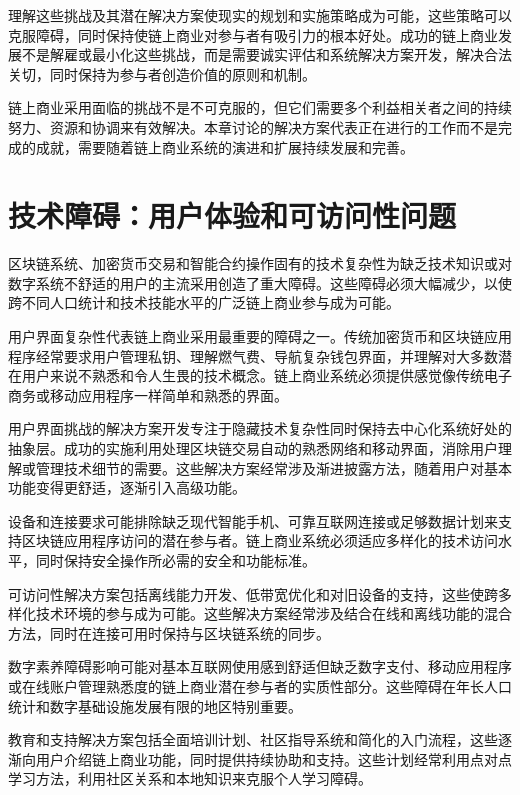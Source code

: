 \documentclass[
  Letterpaper,
]{scrbook}
\begin{document}
理解这些挑战及其潜在解决方案使现实的规划和实施策略成为可能，这些策略可以克服障碍，同时保持使链上商业对参与者有吸引力的根本好处。成功的链上商业发展不是解雇或最小化这些挑战，而是需要诚实评估和系统解决方案开发，解决合法关切，同时保持为参与者创造价值的原则和机制。

链上商业采用面临的挑战不是不可克服的，但它们需要多个利益相关者之间的持续努力、资源和协调来有效解决。本章讨论的解决方案代表正在进行的工作而不是完成的成就，需要随着链上商业系统的演进和扩展持续发展和完善。

\section{技术障碍：用户体验和可访问性问题}\label{ux6280ux672fux969cux788dux7528ux6237ux4f53ux9a8cux548cux53efux8bbfux95eeux6027ux95eeux9898}

区块链系统、加密货币交易和智能合约操作固有的技术复杂性为缺乏技术知识或对数字系统不舒适的用户的主流采用创造了重大障碍。这些障碍必须大幅减少，以使跨不同人口统计和技术技能水平的广泛链上商业参与成为可能。

用户界面复杂性代表链上商业采用最重要的障碍之一。传统加密货币和区块链应用程序经常要求用户管理私钥、理解燃气费、导航复杂钱包界面，并理解对大多数潜在用户来说不熟悉和令人生畏的技术概念。链上商业系统必须提供感觉像传统电子商务或移动应用程序一样简单和熟悉的界面。

用户界面挑战的解决方案开发专注于隐藏技术复杂性同时保持去中心化系统好处的抽象层。成功的实施利用处理区块链交易自动的熟悉网络和移动界面，消除用户理解或管理技术细节的需要。这些解决方案经常涉及渐进披露方法，随着用户对基本功能变得更舒适，逐渐引入高级功能。

设备和连接要求可能排除缺乏现代智能手机、可靠互联网连接或足够数据计划来支持区块链应用程序访问的潜在参与者。链上商业系统必须适应多样化的技术访问水平，同时保持安全操作所必需的安全和功能标准。

可访问性解决方案包括离线能力开发、低带宽优化和对旧设备的支持，这些使跨多样化技术环境的参与成为可能。这些解决方案经常涉及结合在线和离线功能的混合方法，同时在连接可用时保持与区块链系统的同步。

数字素养障碍影响可能对基本互联网使用感到舒适但缺乏数字支付、移动应用程序或在线账户管理熟悉度的链上商业潜在参与者的实质性部分。这些障碍在年长人口统计和数字基础设施发展有限的地区特别重要。

教育和支持解决方案包括全面培训计划、社区指导系统和简化的入门流程，这些逐渐向用户介绍链上商业功能，同时提供持续协助和支持。这些计划经常利用点对点学习方法，利用社区关系和本地知识来克服个人学习障碍。
\end{document}
